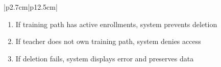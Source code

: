 \begin{table}[H]
\begin{tabular}{|p{2.7cm}|p{12.5cm}|}
\begin{minipage}[t]{\linewidth}
\begin{enumerate}[topsep=0pt,itemsep=1pt,parsep=0pt,partopsep=0pt]
                                          \item If training path has active enrollments, system prevents deletion
                                          \item If teacher does not own training path, system denies access
                                          \item If deletion fails, system displays error and preserves data
                                      \end{enumerate}
                                  \end{minipage} \\
        \hline
    \end{tabular}
    \label{tab:teacher-delete-tp}
\end{table}

